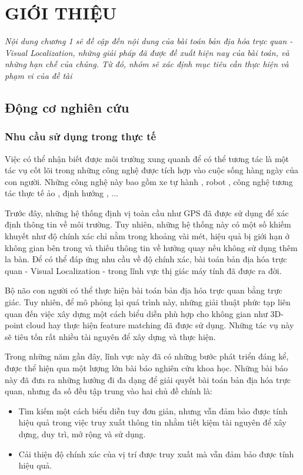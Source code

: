 \chapter{GIỚI THIỆU}

\textit{Nội dung chương 1 sẽ đề cập đến nội dung của bài toán bản địa hóa trực quan - Visual Localization, những giải pháp đã được đề xuất hiện nay của bài toán, và những hạn chế của chúng. Từ đó, nhóm sẽ xác định mục tiêu cần thực hiện và phạm vi của đề tài}

\section{Động cơ nghiên cứu}

\subsection{Nhu cầu sử dụng trong thực tế}

Việc có thể nhận biết được môi trường xung quanh để có thể tương tác là một tác vụ cốt lõi trong những công nghệ được tích hợp vào cuộc sống hàng ngày của con người. Những công nghệ này bao gồm xe tự hành \cite{chaabane2021end}, robot \cite{sunderhauf2015place}, công nghệ tương tác thực tế ảo \cite{middelberg2014scalable}, định hướng \cite{sarlin2023orienternet}, ... 

Trước đây, những hệ thống định vị toàn cầu như GPS đã được sử dụng để xác định thông tin về môi trường. Tuy nhiên, những hệ thống này có một số khiếm khuyết như độ chính xác chỉ nằm trong khoảng vài mét, hiệu quả bị giới hạn ở không gian bên trong và thiếu thông tin về hướng quay nếu không sử dụng thêm la bàn. Để có thể đáp ứng nhu cầu về độ chính xác, bài toán bản địa hóa trực quan - Visual Localization - trong lĩnh vực thị giác máy tính đã được ra đời.

Bộ não con người có thể thực hiện bài toán bản địa hóa trực quan bằng trực giác. Tuy nhiên, để mô phỏng lại quá trình này, những giải thuật phức tạp liên quan đến việc xây dựng một cách biểu diễn phù hợp cho không gian như 3D-point cloud hay thực hiện feature matching đã được sử dụng. Những tác vụ này sẽ tiêu tốn rất nhiều tài nguyên để xây dựng và thực hiện.

Trong những năm gần đây, lĩnh vực này đã có những bước phát triển đáng kể, được thể hiện qua một lượng lớn bài báo nghiên cứu khoa học. Những bài báo này đã đưa ra những hướng đi đa dạng để giải quyết bài toán bản địa hóa trực quan, nhưng đa số đều tập trung vào hai chủ đề chính là:
\begin{itemize}
    \item Tìm kiếm một cách biểu diễn tuy đơn giản, nhưng vẫn đảm bảo được tính hiệu quả trong việc truy xuất thông tin nhằm tiết kiệm tài nguyên để xây dựng, duy trì, mở rộng và sử dụng.
    \item Cải thiện độ chính xác của vị trí được truy xuất mà vẫn đảm bảo được tính hiệu quả.
\end{itemize}

